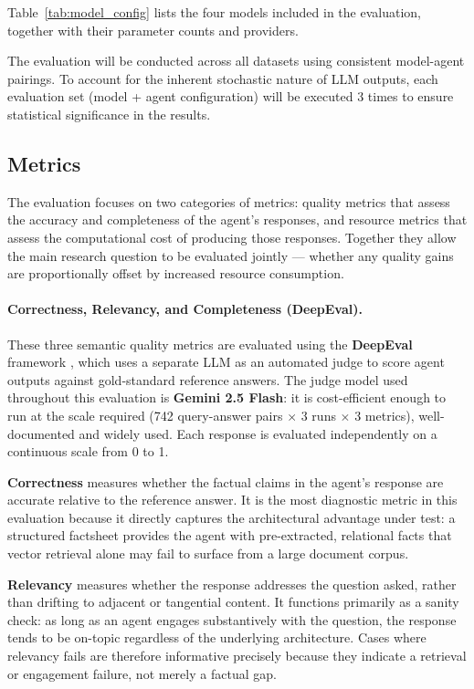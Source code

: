 Table~\ref{tab:model_config} lists the four models included in the evaluation, together with their parameter counts and providers.

The evaluation will be conducted across all datasets using consistent model-agent pairings. To account for the inherent stochastic nature of LLM outputs, each evaluation set (model + agent configuration) will be executed 3 times to ensure statistical significance in the results.

\subsection{Metrics}
\label{sec:metrics}

The evaluation focuses on two categories of metrics: quality metrics that assess the accuracy and completeness of the agent's responses, and resource metrics that assess the computational cost of producing those responses. Together they allow the main research question to be evaluated jointly --- whether any quality gains are proportionally offset by increased resource consumption.

\paragraph{Correctness, Relevancy, and Completeness (DeepEval).}
These three semantic quality metrics are evaluated using the \textbf{DeepEval} framework \cite{deepeval}, which uses a separate LLM as an automated judge to score agent outputs against gold-standard reference answers. 
The judge model used throughout this evaluation is \textbf{Gemini 2.5 Flash}: it is cost-efficient enough to run at the scale required (742 query-answer pairs $\times$ 3 runs $\times$ 3 metrics), well-documented and widely used. 
Each response is evaluated independently on a continuous scale from 0 to 1.

\textbf{Correctness} measures whether the factual claims in the agent's response are accurate relative to the reference answer. It is the most diagnostic metric in this evaluation because it directly captures the architectural advantage under test: a structured factsheet provides the agent with pre-extracted, relational facts that vector retrieval alone may fail to surface from a large document corpus.

\textbf{Relevancy} measures whether the response addresses the question asked, rather than drifting to adjacent or tangential content. It functions primarily as a sanity check: as long as an agent engages substantively with the question, the response tends to be on-topic regardless of the underlying architecture. Cases where relevancy fails are therefore informative precisely because they indicate a retrieval or engagement failure, not merely a factual gap.

